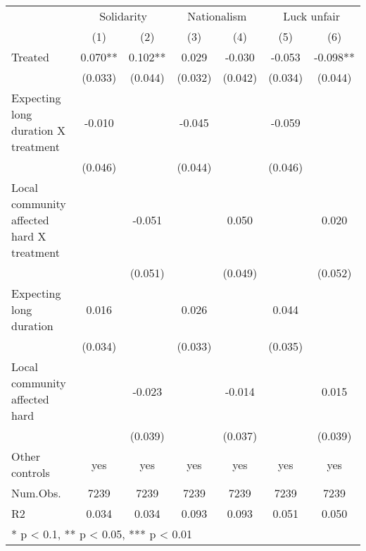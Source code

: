 \begin{table}[H]
\centering
\begin{tabular}[t]{lcccccc}
\toprule
\multicolumn{1}{c}{ } & \multicolumn{2}{c}{Solidarity} & \multicolumn{2}{c}{Nationalism} & \multicolumn{2}{c}{Luck unfair} \\
\cmidrule(l{3pt}r{3pt}){2-3} \cmidrule(l{3pt}r{3pt}){4-5} \cmidrule(l{3pt}r{3pt}){6-7}
  & (1) & (2) & (3) & (4) & (5) & (6)\\
\midrule
Treated & 0.070** & 0.102** & 0.029 & -0.030 & -0.053 & -0.098**\\
 & (0.033) & (0.044) & (0.032) & (0.042) & (0.034) & (0.044)\\
Expecting long duration X treatment & -0.010 &  & -0.045 &  & -0.059 & \\
 & (0.046) &  & (0.044) &  & (0.046) & \\
Local community affected hard X treatment &  & -0.051 &  & 0.050 &  & 0.020\\
 &  & (0.051) &  & (0.049) &  & (0.052)\\
Expecting long duration & 0.016 &  & 0.026 &  & 0.044 & \\
 & (0.034) &  & (0.033) &  & (0.035) & \\
Local community affected hard &  & -0.023 &  & -0.014 &  & 0.015\\
 &  & (0.039) &  & (0.037) &  & (0.039)\\
\midrule
Other controls & yes & yes & yes & yes & yes & yes\\
Num.Obs. & 7239 & 7239 & 7239 & 7239 & 7239 & 7239\\
R2 & 0.034 & 0.034 & 0.093 & 0.093 & 0.051 & 0.050\\
\bottomrule
\multicolumn{7}{l}{\textsuperscript{} * p < 0.1, ** p < 0.05, *** p < 0.01}\\
\end{tabular}
\end{table}
